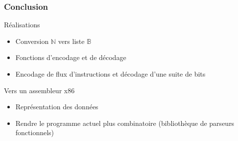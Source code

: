 \documentclass{beamer}
\begin{document}
\begin{frame}
  \frametitle{Conclusion}
  
  \begin{block}{Réalisations}
    \begin{itemize}
    \item Conversion \ensuremath{\mathbb{N}} vers liste \ensuremath{\mathbb{B}}
    \item Fonctions d'encodage et de décodage
    \item Encodage de flux d'instructions et décodage d'une suite de bits
    \end{itemize}
  \end{block}  
  
  \begin{block}{Vers un assembleur x86}
    \begin{itemize}
    \item Représentation des données
    \item Rendre le programme actuel plus combinatoire (bibliothèque de parseurs fonctionnels)
    \end{itemize}
  \end{block}
  
\end{frame}
\end{document}
